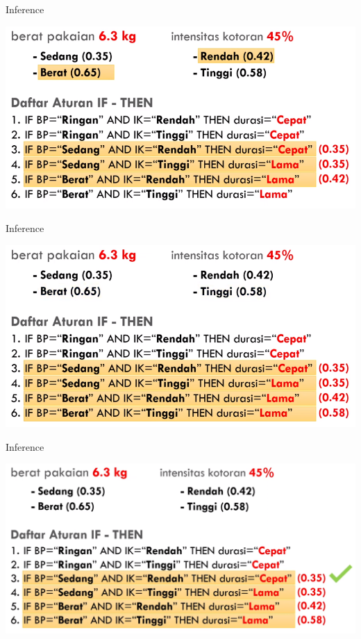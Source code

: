\documentclass[pdflatex,compress,mathserif]{beamer}
\begin{document}
\begin{frame}{Inference}
	\begin{center}
		\includegraphics[width=\linewidth]{img/32}
	\end{center}
\end{frame}

\begin{frame}{Inference}
	\begin{center}
		\includegraphics[width=\linewidth]{img/33}
	\end{center}
\end{frame}

\begin{frame}{Inference}
	\begin{center}
		\includegraphics[width=\linewidth]{img/34}
	\end{center}
\end{frame}
\end{document}

